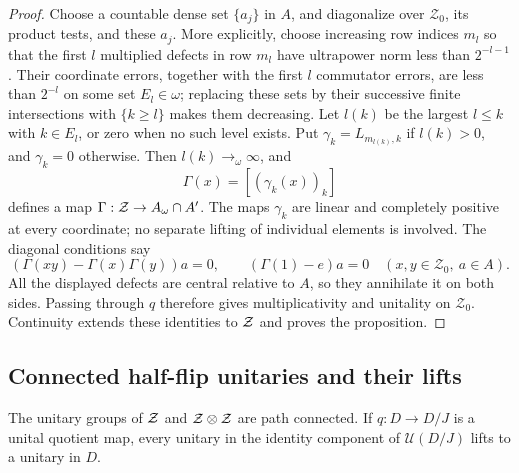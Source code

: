 \begin{proof}
Choose a countable dense set $\{a_j\}$ in $A$, and diagonalize
over $\mathcal Z_0$, its product tests, and these $a_j$.
More explicitly, choose increasing row indices $m_l$ so that the
first $l$ multiplied defects in row $m_l$ have ultrapower norm less
than $2^{-l-1}$. Their coordinate errors, together with the first
$l$ commutator errors, are less than $2^{-l}$ on some set
$E_l\in\omega$; replacing these sets by their successive finite
intersections with $\{k\ge l\}$ makes them decreasing. Let $l(k)$
be the largest $l\le k$ with $k\in E_l$, or zero when no such level
exists. Put $\gamma_k=L_{m_{l(k)},k}$ if $l(k)>0$, and $\gamma_k=0$
otherwise. Then $l(k)\to_\omega\infty$, and
\[
 \Gamma(x)=[(\gamma_k(x))_k]
\]
defines a \cpc map $\Gamma:\mathcal Z\to A_\omega\cap A'$. The maps
$\gamma_k$ are linear and completely positive at every coordinate; no
separate lifting of individual elements is involved.  The diagonal
conditions say
\[
 (\Gamma(xy)-\Gamma(x)\Gamma(y))a=0,\qquad
 (\Gamma(1)-e)a=0
 \quad(x,y\in\mathcal Z_0,\ a\in A).
\]
All the displayed defects are central relative to $A$, so they
annihilate it on both sides.  Passing through $q$ therefore gives
multiplicativity and unitality on $\mathcal Z_0$.  Continuity extends
these identities to $\mathcal Z$ and proves the proposition.
\end{proof}

\subsection{Connected half-flip unitaries and their lifts}

\begin{lemma}\label{abs:connected-unitaries}
The unitary groups of $\mathcal Z$ and $\mathcal Z\otimes\mathcal Z$ are path connected.
If $q:D\to D/J$ is a unital quotient map, every unitary in the
identity component of $\mathcal U(D/J)$ lifts to a unitary in $D$.
\end{lemma}

